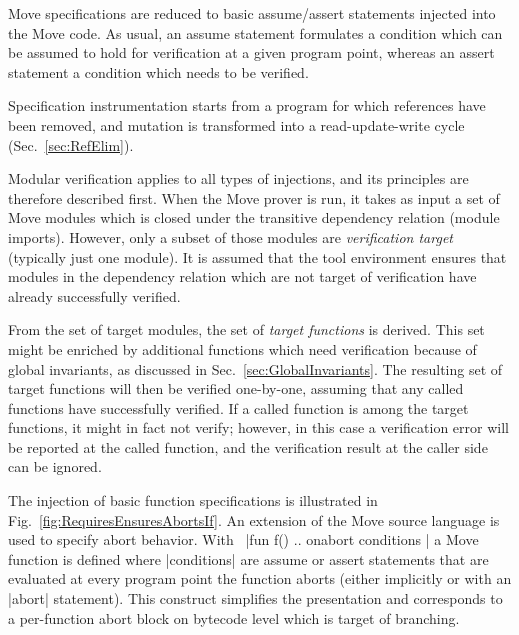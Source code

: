 
Move specifications are reduced to basic assume/assert statements injected into
the Move code. As usual, an assume statement formulates a condition which can be
assumed to hold for verification at a given program point, whereas an assert
statement a condition which needs to be verified.


Specification instrumentation starts from a program for which references have
been removed, and mutation is transformed into a read-update-write cycle
(Sec.~\ref{sec:RefElim}).


\label{sec:ModularVerification}

Modular verification applies to all types of injections, and its principles are
therefore described first. When the Move prover is run, it takes as input a set
of Move modules which is closed under the transitive dependency relation (module
imports). However, only a subset of those modules are \emph{verification target}
(typically just one module). It is assumed that the tool environment ensures
that modules in the dependency relation which are not target of verification
have already successfully verified.

From the set of target modules, the set of \emph{target functions} is
derived. This set might be enriched by additional functions which need
verification because of global invariants, as discussed in
Sec.~\ref{sec:GlobalInvariants}. The resulting set of target functions will then
be verified one-by-one, assuming that any called functions have successfully
verified. If a called function is among the target functions, it might in fact
not verify; however, in this case a verification error will be reported at the
called function, and the verification result at the caller side can be ignored.


The injection of basic function specifications is illustrated in
Fig.~\ref{fig:RequiresEnsuresAbortsIf}.  An extension of the Move source
language is used to specify abort behavior. With~%
|fun f() { .. } onabort { conditions }| a Move function is defined where
|conditions| are assume or assert statements that are evaluated at every program
point the function aborts (either implicitly or with an |abort| statement). This
construct simplifies the presentation and corresponds to a per-function abort
block on bytecode level which is target of branching.

